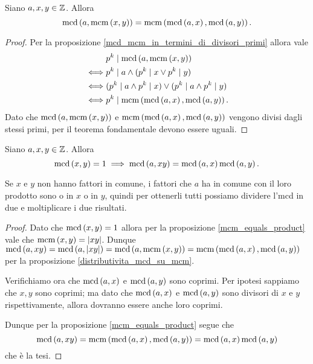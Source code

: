 \begin{proposition} \label{distributivita_mcd_su_mcm}
    Siano $a, x, y \in \mathbb{Z}$. Allora 
    \begin{equation}
        \operatorname{mcd}\left(a, \operatorname{mcm}\left(x, y\right)\right) = \operatorname{mcm}\left(\operatorname{mcd}\left(a, x\right), \operatorname{mcd}\left(a, y\right)\right).
    \end{equation}
\end{proposition}
\begin{proof}
    Per la proposizione \ref{mcd_mcm_in_termini_di_divisori_primi} allora vale
    \begin{alignat*}
        {1}
        &p^k \mid \operatorname{mcd}\left(a, \operatorname{mcm}\left(x, y\right)\right)\\ 
        \iff &p^k \mid a \land (p^k \mid x \lor p^k \mid y)\\
        \iff &(p^k \mid a \land p^k \mid x) \lor (p^k \mid a \land p^k \mid y) \\
        \iff &p^k \mid \operatorname{mcm}\left(\operatorname{mcd}\left(a, x\right), \operatorname{mcd}\left(a, y\right)\right).
    \end{alignat*}
    Dato che $\operatorname{mcd}\left(a, \operatorname{mcm}\left(x, y\right)\right)$ e $\operatorname{mcm}\left(\operatorname{mcd}\left(a, x\right), \operatorname{mcd}\left(a, y\right)\right)$ vengono divisi dagli stessi primi, per il teorema fondamentale devono essere uguali.
\end{proof}

\begin{proposition}
    Siano $a, x, y \in \mathbb{Z}$. Allora 
    \begin{equation}
        \operatorname{mcd}\left(x, y\right) = 1 \implies \operatorname{mcd}\left(a, xy\right) = \operatorname{mcd}\left(a, x\right)\operatorname{mcd}\left(a, y\right).
    \end{equation}
\end{proposition}
\begin{intuition}
    Se $x$ e $y$ non hanno fattori in comune, i fattori che $a$ ha in comune con il loro prodotto sono o in $x$ o in $y$, quindi per ottenerli tutti possiamo dividere l'mcd in due e moltiplicare i due risultati.
\end{intuition}
\begin{proof}
    Dato che $\operatorname{mcd}\left(x, y\right) = 1$ allora per la proposizione \ref{mcm_equals_product} vale che $\operatorname{mcm}\left(x, y\right) = \left|xy\right|$.
    Dunque $\operatorname{mcd}\left(a, xy\right) = \operatorname{mcd}\left(a, \left|xy\right|\right) = \operatorname{mcd}\left(a, \operatorname{mcm}\left(x, y\right)\right) = \operatorname{mcm}\left(\operatorname{mcd}\left(a, x\right), \operatorname{mcd}\left(a, y\right)\right)$ per la proposizione \ref{distributivita_mcd_su_mcm}.

    Verifichiamo ora che $\operatorname{mcd}\left(a, x\right)$ e $\operatorname{mcd}\left(a, y\right)$ sono coprimi. Per ipotesi sappiamo che $x, y$ sono coprimi; ma dato che $\operatorname{mcd}\left(a, x\right)$ e $\operatorname{mcd}\left(a, y\right)$ sono divisori di $x$ e $y$ rispettivamente, allora dovranno essere anche loro coprimi.

    Dunque per la proposizione \ref{mcm_equals_product} segue che \[
        \operatorname{mcd}\left(a, xy\right) = \operatorname{mcm}\left(\operatorname{mcd}\left(a, x\right), \operatorname{mcd}\left(a, y\right)\right) = \operatorname{mcd}\left(a, x\right)\operatorname{mcd}\left(a, y\right)
    \] che è la tesi.
\end{proof}

